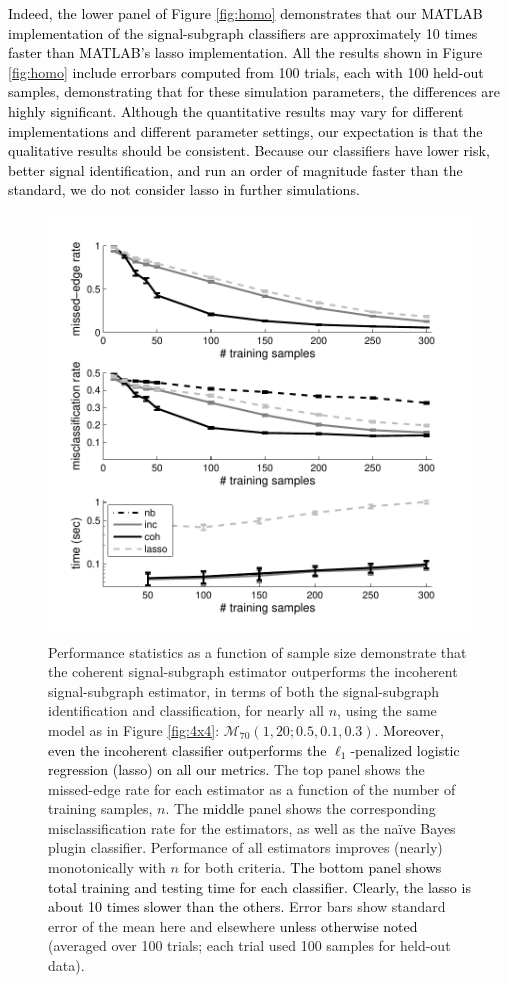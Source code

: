 \documentclass[10pt,journal,cspaper,compsoc]{IEEEtran}
\providecommand{\tk}[1]{\textcolor{black}{#1}}
\providecommand{\mc}[1]{\mathcal{#1}}
\newcommand{\comment}[1]{}
\begin{document}
\tk{Indeed, the lower panel of Figure \ref{fig:homo} demonstrates that our MATLAB implementation of the signal-subgraph classifiers are approximately 10 times faster than MATLAB's lasso implementation.  All the results shown in Figure \ref{fig:homo} include errorbars computed from 100 trials, each with 100 held-out samples, demonstrating that for these simulation parameters, the differences are highly significant.  Although the quantitative results may vary for different implementations and different parameter settings, our expectation is that the qualitative results should be consistent.  Because our classifiers have lower risk, better signal identification, and run an order of magnitude faster than the standard, we do not consider lasso in further simulations.}


\begin{figure}[htbp]
	\centering
		\includegraphics[width=1.0\linewidth]{../figs/fig3_homo_V70_s20_p10_q30_Lhats.pdf}
	\caption{Performance statistics as a function of sample size demonstrate that the coherent signal-subgraph estimator outperforms the incoherent signal-subgraph estimator, in terms of both the signal-subgraph identification and classification, for nearly all $n$, using the same model as in Figure \ref{fig:4x4}: $\mc{M}_{70}(1,20;0.5,0.1,0.3)$.  \tk{Moreover, even the incoherent classifier outperforms the $\ell_1$-penalized logistic regression (lasso) on all our metrics.}	The top panel shows the missed-edge rate for each estimator as a function of the number of training samples, $n$.  The \tk{middle} \comment{bottom} panel shows the corresponding misclassification rate for the estimators, as well as the na\"ive Bayes plugin classifier.  Performance of all estimators improves (nearly) monotonically with $n$ for both criteria. \tk{The bottom panel shows total training and testing time for each classifier.  Clearly, the lasso is about 10 times slower than the others.} Error bars show standard error of the mean here and elsewhere \tk{unless otherwise noted} (averaged over 100 trials; each trial used 100 samples for held-out data). 
}
\end{figure}
\end{document}
